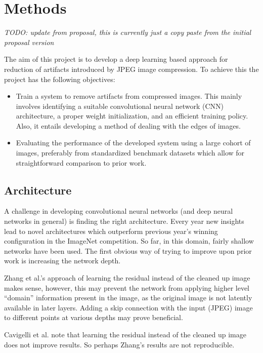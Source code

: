 \chapter{Methods}

\textit{TODO: update from proposal, this is currently just a copy paste from the initial proposal version}



The aim of this project is to develop a deep learning based approach for reduction of artifacts introduced by JPEG image compression.  To achieve this the project has the following objectives:

\begin{itemize}
\item Train a system to remove artifacts from compressed images. This mainly involves identifying a suitable convolutional neural network (CNN) architecture, a proper weight initialization, and an efficient training policy. Also, it entails developing a method of dealing with the edges of images.
\item Evaluating the performance of the developed system using a large cohort of images, preferably from standardized benchmark datasets which allow for straightforward comparison to prior work.
\end{itemize}

\section{Architecture}

A challenge in developing convolutional neural networks (and deep neural networks in general) is finding the right architecture. Every year new insights lead to novel architectures which outperform previous year's winning configuration in the ImageNet competition. So far, in this domain, fairly shallow networks have been used. The first obvious way of trying to improve upon prior work is increasing the network depth.

Zhang et al.'s approach of learning the residual instead of the cleaned up image makes sense, however, this may prevent the network from applying higher level ``domain'' information present in the image, as the original image is not latently available in later layers. Adding a skip connection with the input (JPEG) image to different points at various depths may prove beneficial. 

Cavigelli et al. \cite{CavigelliHB16} note that learning the residual instead of the cleaned up image does not improve results. So perhaps Zhang's results are not reproducible.

